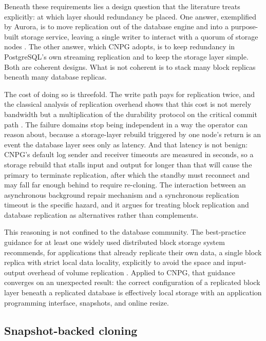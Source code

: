 \documentclass[11pt,a4paper]{article}
\begin{document}
Beneath these requirements lies a design question that the literature treats explicitly: at which layer should redundancy be placed. One answer, exemplified by Aurora, is to move replication out of the database engine and into a purpose-built storage service, leaving a single writer to interact with a quorum of storage nodes \cite{verbitski-aurora}. The other answer, which CNPG adopts, is to keep redundancy in PostgreSQL's own streaming replication and to keep the storage layer simple. Both are coherent designs. What is not coherent is to stack many block replicas beneath many database replicas.

The cost of doing so is threefold. The write path pays for replication twice, and the classical analysis of replication overhead shows that this cost is not merely bandwidth but a multiplication of the durability protocol on the critical commit path \cite{gray-replication}. The failure domains stop being independent in a way the operator can reason about, because a storage-layer rebuild triggered by one node's return is an event the database layer sees only as latency. And that latency is not benign: CNPG's default log sender and receiver timeouts are measured in seconds, so a storage rebuild that stalls input and output for longer than that will cause the primary to terminate replication, after which the standby must reconnect and may fall far enough behind to require re-cloning. The interaction between an asynchronous background repair mechanism and a synchronous replication timeout is the specific hazard, and it argues for treating block replication and database replication as alternatives rather than complements.

This reasoning is not confined to the database community. The best-practice guidance for at least one widely used distributed block storage system recommends, for applications that already replicate their own data, a single block replica with strict local data locality, explicitly to avoid the space and input-output overhead of volume replication \cite{longhorn-best-practices,longhorn-expansion}. Applied to CNPG, that guidance converges on an unexpected result: the correct configuration of a replicated block layer beneath a replicated database is effectively local storage with an application programming interface, snapshots, and online resize.

\subsection{Snapshot-backed cloning}
\end{document}
